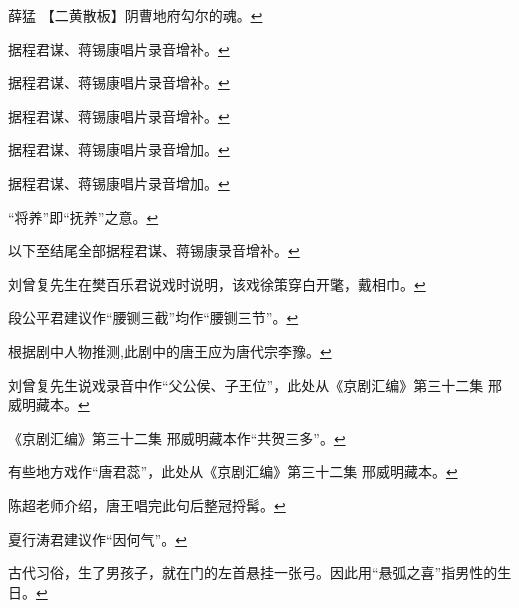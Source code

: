   薛猛 【二黄散板】阴曹地府勾尔的魂。\protect\hyperlink{fnref371}{↩}
\item
  \leavevmode\hypertarget{fn372}{}%
  据程君谋、蒋锡康唱片录音增补。\protect\hyperlink{fnref372}{↩}
\item
  \leavevmode\hypertarget{fn373}{}%
  据程君谋、蒋锡康唱片录音增补。\protect\hyperlink{fnref373}{↩}
\item
  \leavevmode\hypertarget{fn374}{}%
  据程君谋、蒋锡康唱片录音增补。\protect\hyperlink{fnref374}{↩}
\item
  \leavevmode\hypertarget{fn375}{}%
  据程君谋、蒋锡康唱片录音增加。\protect\hyperlink{fnref375}{↩}
\item
  \leavevmode\hypertarget{fn376}{}%
  据程君谋、蒋锡康唱片录音增加。\protect\hyperlink{fnref376}{↩}
\item
  \leavevmode\hypertarget{fn377}{}%
  ``将养''即``抚养''之意。\protect\hyperlink{fnref377}{↩}
\item
  \leavevmode\hypertarget{fn378}{}%
  以下至结尾全部据程君谋、蒋锡康录音增补。\protect\hyperlink{fnref378}{↩}
\item
  \leavevmode\hypertarget{fn379}{}%
  刘曾复先生在樊百乐君说戏时说明，该戏徐策穿白开氅，戴相巾。\protect\hyperlink{fnref379}{↩}
\item
  \leavevmode\hypertarget{fn380}{}%
  段公平君建议作``腰铡三截''均作``腰铡三节''。\protect\hyperlink{fnref380}{↩}
\item
  \leavevmode\hypertarget{fn381}{}%
  根据剧中人物推测,此剧中的唐王应为唐代宗李豫。\protect\hyperlink{fnref381}{↩}
\item
  \leavevmode\hypertarget{fn382}{}%
  刘曾复先生说戏录音中作``父公侯、子王位''，此处从《京剧汇编》第三十二集
  邢威明藏本。\protect\hyperlink{fnref382}{↩}
\item
  \leavevmode\hypertarget{fn383}{}%
  《京剧汇编》第三十二集
  邢威明藏本作``共贺三多''。\protect\hyperlink{fnref383}{↩}
\item
  \leavevmode\hypertarget{fn384}{}%
  有些地方戏作``唐君蕊''，此处从《京剧汇编》第三十二集
  邢威明藏本。\protect\hyperlink{fnref384}{↩}
\item
  \leavevmode\hypertarget{fn385}{}%
  陈超老师介绍，唐王唱完此句后整冠捋髯。\protect\hyperlink{fnref385}{↩}
\item
  \leavevmode\hypertarget{fn386}{}%
  夏行涛君建议作``因何气''。\protect\hyperlink{fnref386}{↩}
\item
  \leavevmode\hypertarget{fn387}{}%
  古代习俗，生了男孩子，就在门的左首悬挂一张弓。因此用``悬弧之喜''指男性的生日。\protect\hyperlink{fnref387}{↩}
